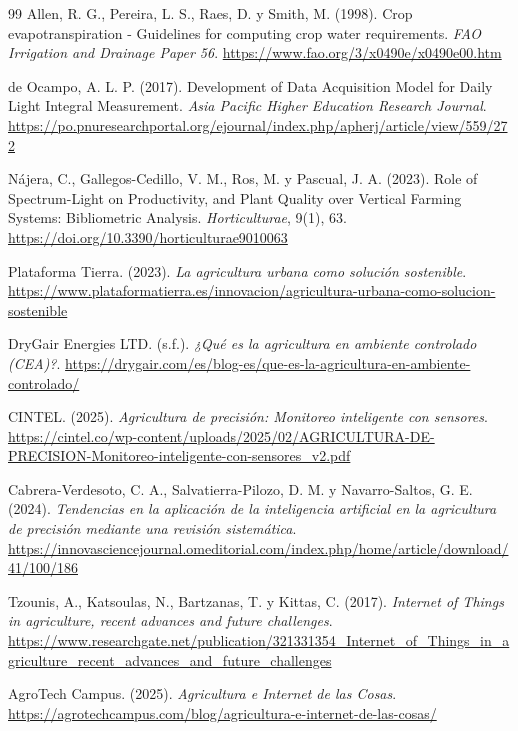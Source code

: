 \begin{thebibliography}{99}
Allen, R. G., Pereira, L. S., Raes, D. y Smith, M. (1998). Crop evapotranspiration - Guidelines for computing crop water requirements. \textit{FAO Irrigation and Drainage Paper 56}. \url{https://www.fao.org/3/x0490e/x0490e00.htm}

de Ocampo, A. L. P. (2017). Development of Data Acquisition Model for Daily Light Integral Measurement. \textit{Asia Pacific Higher Education Research Journal}. \url{https://po.pnuresearchportal.org/ejournal/index.php/apherj/article/view/559/272}

Nájera, C., Gallegos-Cedillo, V. M., Ros, M. y Pascual, J. A. (2023). Role of Spectrum-Light on Productivity, and Plant Quality over Vertical Farming Systems: Bibliometric Analysis. \textit{Horticulturae}, 9(1), 63. \url{https://doi.org/10.3390/horticulturae9010063}

Plataforma Tierra. (2023). \textit{La agricultura urbana como solución sostenible}. \url{https://www.plataformatierra.es/innovacion/agricultura-urbana-como-solucion-sostenible}

DryGair Energies LTD. (s.f.). \textit{¿Qué es la agricultura en ambiente controlado (CEA)?}. \url{https://drygair.com/es/blog-es/que-es-la-agricultura-en-ambiente-controlado/}

CINTEL. (2025). \textit{Agricultura de precisión: Monitoreo inteligente con sensores}. \url{https://cintel.co/wp-content/uploads/2025/02/AGRICULTURA-DE-PRECISION-Monitoreo-inteligente-con-sensores_v2.pdf}

Cabrera-Verdesoto, C. A., Salvatierra-Pilozo, D. M. y Navarro-Saltos, G. E. (2024). \textit{Tendencias en la aplicación de la inteligencia artificial en la agricultura de precisión mediante una revisión sistemática}. \url{https://innovasciencejournal.omeditorial.com/index.php/home/article/download/41/100/186}

Tzounis, A., Katsoulas, N., Bartzanas, T. y Kittas, C. (2017). \textit{Internet of Things in agriculture, recent advances and future challenges}. \url{https://www.researchgate.net/publication/321331354_Internet_of_Things_in_agriculture_recent_advances_and_future_challenges}

AgroTech Campus. (2025). \textit{Agricultura e Internet de las Cosas}. \url{https://agrotechcampus.com/blog/agricultura-e-internet-de-las-cosas/}


\end{thebibliography}
